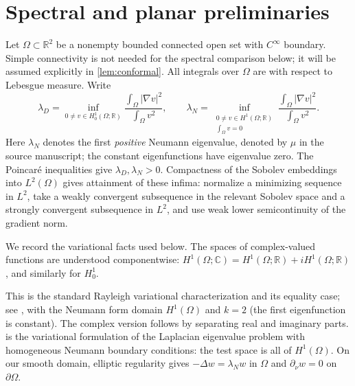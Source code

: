 \section{Spectral and planar preliminaries}\label{sec:preliminaries}

Let $\Omega\subset\mathbb R^2$ be a nonempty bounded connected open set with
$C^\infty$ boundary. Simple connectivity is not needed for the spectral comparison
below; it will be assumed explicitly in \cref{lem:conformal}.
All integrals over $\Omega$ are with respect to Lebesgue measure.
Write
\[
 \lambda_D=\inf_{0\ne v\in H_0^1(\Omega;\mathbb R)}
 \frac{\int_\Omega|\nabla v|^2}{\int_\Omega v^2},
 \qquad
 \lambda_N=\inf_{\substack{0\ne v\in H^1(\Omega;\mathbb R)\\
                          \int_\Omega v=0}}
 \frac{\int_\Omega|\nabla v|^2}{\int_\Omega v^2}.
\]
Here $\lambda_N$ denotes the first \emph{positive} Neumann eigenvalue, denoted
by $\mu$ in the source manuscript; the constant eigenfunctions have eigenvalue
zero. The Poincar\'e inequalities give $\lambda_D,\lambda_N>0$.
Compactness of the Sobolev embeddings into $L^2(\Omega)$ gives attainment of
these infima: normalize a minimizing sequence in $L^2$, take a weakly
convergent subsequence in the relevant Sobolev space and a strongly convergent
subsequence in $L^2$, and use weak lower semicontinuity of the gradient norm.

We record the variational facts used below. The spaces of complex-valued functions
are understood componentwise: $H^1(\Omega;\mathbb C)=H^1(\Omega;\mathbb R)
+iH^1(\Omega;\mathbb R)$, and similarly for $H_0^1$.

This is the standard Rayleigh variational characterization and its equality
case; see \cite[Theorem 11, pp.~6--7]{Gantumur}, with the Neumann form
domain $H^1(\Omega)$ and $k=2$ (the first eigenfunction is constant).
The complex version follows by separating real and imaginary parts.
 is the variational formulation of the
Laplacian eigenvalue problem with homogeneous Neumann boundary conditions:
the test space is all of $H^1(\Omega)$. On our smooth domain, elliptic
regularity \cite[Chapter III, Theorems 6.4 and 6.5]{Showalter} gives
$-\Delta w=\lambda_Nw$ in $\Omega$ and $\partial_\nu w=0$ on
$\partial\Omega$.

